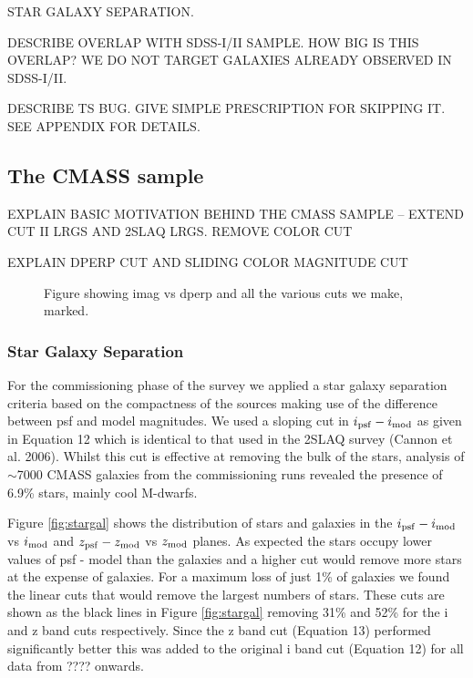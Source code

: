 \documentclass[preprint]{aastex}
\newcommand{\imod}{i_{\rm mod}}
\newcommand{\ipsf}{i_{\rm psf}}
\newcommand{\zpsf}{z_{\rm psf}}
\newcommand{\zmod}{z_{\rm mod}}
\begin{document}
STAR GALAXY SEPARATION.

DESCRIBE OVERLAP WITH SDSS-I/II SAMPLE. HOW BIG IS THIS OVERLAP? WE DO NOT
TARGET GALAXIES ALREADY OBSERVED IN SDSS-I/II.

DESCRIBE TS BUG. GIVE SIMPLE PRESCRIPTION FOR SKIPPING IT. SEE APPENDIX FOR
DETAILS.

\subsection{The CMASS sample}

EXPLAIN BASIC MOTIVATION BEHIND THE CMASS SAMPLE -- EXTEND CUT II LRGS AND 2SLAQ
LRGS. REMOVE COLOR CUT

EXPLAIN DPERP CUT AND SLIDING COLOR MAGNITUDE CUT

\begin{figure}
\caption{Figure showing imag vs dperp and all the various cuts we make, marked.}
\end{figure}

\subsubsection{Star Galaxy Separation}
For the commissioning phase of the survey we applied a star galaxy separation
criteria based on the compactness of the sources making use of the difference
between psf and model magnitudes. We used a sloping cut in  $\ipsf-\imod$ as
given in Equation 12 which is identical to that used in the 2SLAQ survey (Cannon
et al. 2006). Whilst this cut is effective at removing the bulk of the stars,
analysis of $\sim$7000 CMASS galaxies from the commissioning runs revealed the
presence of 6.9\% stars, mainly cool M-dwarfs.

Figure \ref{fig:stargal} shows the distribution of stars and galaxies in the
$\ipsf-\imod$ vs $\imod$ and $\zpsf-\zmod$ vs $\zmod$ planes. As expected the
stars occupy lower values of psf - model than the galaxies and a higher cut
would remove more stars at the expense of galaxies. For a maximum loss of just
1\% of galaxies we found the linear cuts that would remove the largest numbers
of stars. These cuts are shown as the black lines in Figure \ref{fig:stargal}
removing 31\% and 52\% for the i and z band cuts respectively. Since the z band
cut (Equation 13) performed significantly better this was added to the original
i band cut (Equation 12) for all data from ???? onwards.
\end{document}
